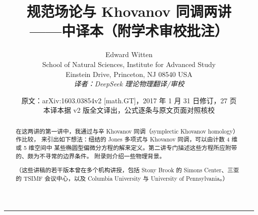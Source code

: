 \newenvironment{keypoints}{%
  \par\medskip\noindent
  \begin{minipage}{\linewidth}%
  \small\noindent\textbf{本节重点（Key Takeaways）}\par\vspace{2pt}\hrule\vspace{5pt}%
  \begin{itemize}[leftmargin=1.6em,itemsep=1pt,topsep=2pt]%
}{%
  \end{itemize}\vspace{2pt}\hrule\end{minipage}\par\medskip%
}



\title{\bfseries 规范场论与 Khovanov 同调两讲\\[4pt]
       \large ——中译本（附学术审校批注）}
\author{Edward Witten\\
  \small School of Natural Sciences, Institute for Advanced Study\\
  \small Einstein Drive, Princeton, NJ 08540 USA\\
  \small\itshape 译者：DeepSeek 理论物理翻译/审校}
\date{\small 原文：arXiv:1603.03854v2 [math.GT]，2017 年 1 月 31 日修订，27 页\\
      \small 本译本据 v2 版全文译出，公式逐条与原文页面对照核校}
\maketitle

\thispagestyle{empty}

\begin{abstract}
\noindent
在这两讲的第一讲中，我通过与辛 Khovanov 同调（symplectic Khovanov homology）作比较，
来引出如下想法：纽结的 Jones 多项式与 Khovanov 同调，可以由计数 4 维或 5 维空间中
某些椭圆型偏微分方程的解来定义。第二讲专门描述这些方程所应附带的、颇为不寻常的边界条件。
附录则介绍一些物理背景。

\medskip
\noindent\small（这些讲稿的若干版本曾在多个机构讲授，包括 Stony Brook 的
Simons Center、三亚的 TSIMF 会议中心，以及 Columbia University 与
University of Pennsylvania。）
\end{abstract}

\vspace{0.5em}
\noindent\rule{\linewidth}{0.4pt}
\vspace{0.3em}

